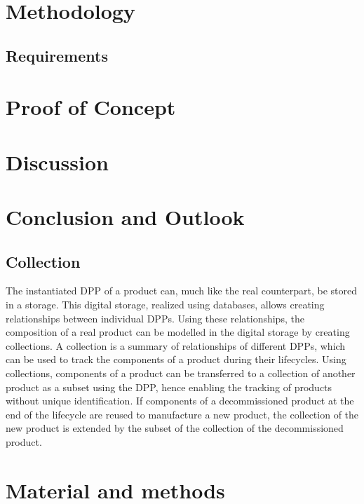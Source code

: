 \documentclass[3p,times,procedia]{elsarticle}
\begin{document}
\section{Methodology}

\subsection{Requirements}

\section{Proof of Concept}

\section{Discussion}

\section{Conclusion and Outlook}

\subsection{Collection}

The instantiated DPP of a product can, much like the real counterpart, be stored in a storage. This digital storage, realized using databases, allows creating relationships between individual DPPs. Using these relationships, the composition of a real product can be modelled in the digital storage by creating collections. A collection is a summary of relationships of different DPPs, which can be used to track the components of a product during their lifecycles. Using collections, components of a product can be transferred to a collection of another product as a subset using the DPP, hence enabling the tracking of products without unique identification. If components of a decommissioned product at the end of the lifecycle are reused to manufacture a new product, the collection of the new product is extended by the subset of the collection of the decommissioned product.


\section{Material and methods}
\end{document}
